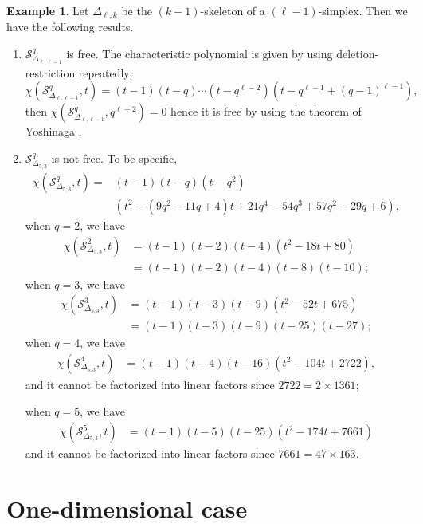\documentclass[12pt]{article}
\theoremstyle{plain}%
\theoremstyle{definition}
\newtheorem{example}[theorem]{Example}
\begin{document}
\begin{example}
    Let $\Delta_{\ell,k}$ be the $(k-1)$-skeleton of a $(\ell-1)$-simplex. Then we have the following results.
    \begin{enumerate}
        \item $\mathcal{S}_{\Delta_{\ell,\ell-1}}^q$ is free. The characteristic polynomial is given by using deletion-restriction repeatedly:
        $$\chi(\mathcal{S}_{\Delta_{\ell,\ell-1}}^q,t)=(t-1)(t-q)\cdots(t-q^{\ell-2})(t-q^{\ell-1}+(q-1)^{\ell-1}),$$
        then $\chi(\mathcal{S}_{\Delta_{\ell,\ell-1}}^q,q^{\ell-2})=0$ hence it is free by using the theorem of Yoshinaga \cite[Theorem 11]{yoshinaga2007free-potjasams}.
        \item $\mathcal{S}_{\Delta_{5,3}}^q$ is not free. To be specific,
        \begin{align*}
            \chi(\mathcal{S}_{\Delta_{5,3}}^q,t)=& (t-1)(t-q)(t-q^2)\\
            &(t^2-(9q^2-11q+4)t+21q^4-54q^3+57q^2-29q+6),
        \end{align*}
        when $q=2$, we have
        \begin{align*}
            \chi(\mathcal{S}_{\Delta_{5,3}}^2,t) &= (t-1)(t-2)(t-4)(t^2-18t+80)\\
            &=(t-1)(t-2)(t-4)(t-8)(t-10);
        \end{align*}
        when $q=3$, we have
        \begin{align*}
            \chi(\mathcal{S}_{\Delta_{5,3}}^3,t) &= (t-1)(t-3)(t-9)(t^2-52t+675)\\
            &=(t-1)(t-3)(t-9)(t-25)(t-27);
        \end{align*}
        when $q=4$, we have
        \begin{align*}
            \chi(\mathcal{S}_{\Delta_{5,3}}^4,t) &= (t-1)(t-4)(t-16)(t^2-104t+2722),
        \end{align*}
        and it cannot be factorized into linear factors since $2722=2\times 1361$;

         when $q=5$, we have
         \begin{align*}
            \chi(\mathcal{S}_{\Delta_{5,3}}^5,t) &= (t-1)(t-5)(t-25)(t^2-174t+7661)
        \end{align*}
        and it cannot be factorized into linear factors since $7661=47\times 163$.
    \end{enumerate}
\end{example}

\section{One-dimensional case}\label{section1dim}
\end{document}
